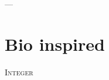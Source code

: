 
\begin{savequote}[85mm]
          {\color{stdgrey}---}
      
\end{savequote}
      
\chapter{Bio inspired}
\label{chap:bio_inspired}
      
 \lettrine[lines=4,findent=5pt]{\textcolor{stdgrey}{I}}{nteger} 
      


%   

